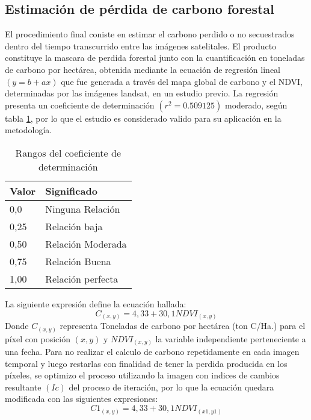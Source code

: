 \subsection{Estimaci\'on de p\'erdida de carbono forestal}
El procedimiento final coniste en estimar el carbono perdido o no secuestrados dentro del tiempo transcurrido entre las im\'agenes satelitales. El producto constituye la mascara de perdida forestal junto con la cuantificaci\'on en toneladas de carbono por hect\'area, obtenida mediante la ecuaci\'on de regresi\'on lineal $(y= b + ax) $ que fue generada a través del mapa global de carbono \cite{saatchi2011benchmark} y el NDVI, determinadas por las im\'agenes landsat, en un estudio previo. La regresi\'on presenta un coeficiente de determinaci\'on $ (r^{2}=0.509125) $ moderado, según tabla \ref{t:coefDeter}, por lo que el estudio es considerado valido para su aplicaci\'on en la metodolog\'ia.
\begin{table}[H]
	\centering
	\begin{tabular}{|l|l|}
		\hline
		\textbf{Valor} & \textbf{Significado} \\ \hline
		0,0            & Ninguna Relaci\'on     \\ \hline
		0,25           & Relaci\'on baja        \\ \hline
		0,50           & Relaci\'on Moderada    \\ \hline
		0,75           & Relaci\'on Buena       \\ \hline
		1,00           & Relaci\'on perfecta    \\ \hline
	\end{tabular}
	\caption{Rangos del coeficiente de determinaci\'on}
	\label{t:coefDeter}
\end{table}
La siguiente expresi\'on define la ecuaci\'on hallada:
		\begin{equation}
			C_{(x,y)}=4,33+30,1 NDVI_{(x,y)}
		\end{equation}
Donde $ C_{(x,y)} $ representa Toneladas de carbono por hect\'area (ton C/Ha.) para el p\'ixel con posici\'on $ (x,y) $ y $ NDVI_{(x,y)} $ la variable independiente perteneciente a una fecha. Para no realizar el calculo de carbono repetidamente en cada imagen temporal y luego restarlas con finalidad de tener la perdida producida en los p\'ixeles, se optimizo el proceso  utilizando la imagen con indices de cambios resultante $ (Ic) $ del proceso de iteraci\'on, por lo que la ecuaci\'on quedara modificada con las siguientes expresiones:
		\begin{equation}
				\label{e:fecha1}
		C1_{(x,y)}=4,33+30,1 NDVI_{(x1,y1)}
		\end{equation}
